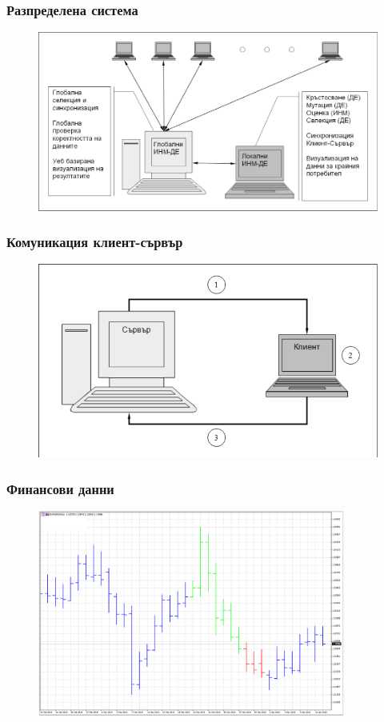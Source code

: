 \documentclass{beamer}
\begin{document}
\begin{frame}
\frametitle{Разпределена система}
\begin{figure}[h]
  \centering
  \includegraphics[width=\textwidth]{DistributedSystem.png}
\end{figure}
\end{frame}

\begin{frame}
\frametitle{Комуникация клиент-сървър}
\begin{figure}[h]
  \centering
  \includegraphics[width=\textwidth]{ClientServer.png}
\end{figure}
\end{frame}

\begin{frame}
\frametitle{Финансови данни}
\begin{figure}[h]
  \centering
  \includegraphics[width=0.9\textwidth]{ForexData.png}
\end{figure}
\end{frame}
\end{document}
